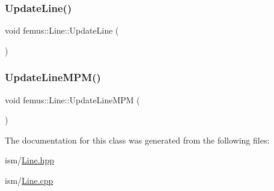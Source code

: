 \mbox{\label{classfemus_1_1_line_a9350d9ca920977a8771356e2f7cd04c1}} 
\subsubsection{\texorpdfstring{Update\+Line()}{UpdateLine()}}
{\footnotesize\ttfamily void femus\+::\+Line\+::\+Update\+Line (\begin{DoxyParamCaption}{ }\end{DoxyParamCaption})}

\mbox{\label{classfemus_1_1_line_a925825ecec878fca65291705b9b8c499}} 
\subsubsection{\texorpdfstring{Update\+Line\+M\+P\+M()}{UpdateLineMPM()}}
{\footnotesize\ttfamily void femus\+::\+Line\+::\+Update\+Line\+M\+PM (\begin{DoxyParamCaption}{ }\end{DoxyParamCaption})}



The documentation for this class was generated from the following files\+:\begin{DoxyCompactItemize}
\item 
ism/\mbox{\hyperlink{_line_8hpp}{Line.\+hpp}}\item 
ism/\mbox{\hyperlink{ism_2_line_8cpp}{Line.\+cpp}}\end{DoxyCompactItemize}
